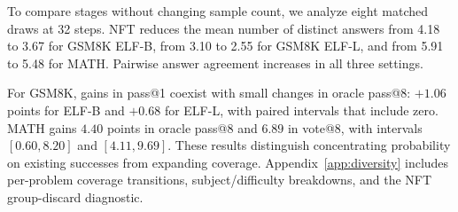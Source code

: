 To compare stages without changing sample count, we analyze eight matched draws at 32 steps. NFT reduces the mean number of distinct answers from 4.18 to 3.67 for GSM8K ELF-B, from 3.10 to 2.55 for GSM8K ELF-L, and from 5.91 to 5.48 for MATH. Pairwise answer agreement increases in all three settings.

For GSM8K, gains in pass@1 coexist with small changes in oracle pass@8: $+1.06$ points for ELF-B and $+0.68$ for ELF-L, with paired intervals that include zero. MATH gains $4.40$ points in oracle pass@8 and $6.89$ in vote@8, with intervals $[0.60,8.20]$ and $[4.11,9.69]$. These results distinguish concentrating probability on existing successes from expanding coverage. Appendix~\ref{app:diversity} includes per-problem coverage transitions, subject/difficulty breakdowns, and the NFT group-discard diagnostic.
